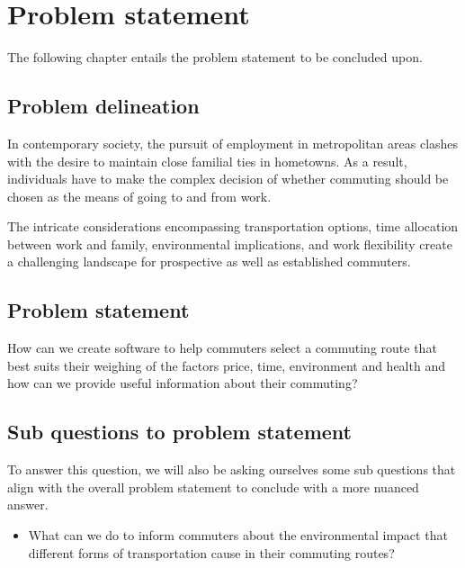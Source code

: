\chapter{Problem statement}\label{ch:problem-statement}

The following chapter entails the problem statement to be concluded upon.

\section{Problem delineation}\label{sec:problem-delineation}

In contemporary society, the pursuit of employment in metropolitan areas clashes with the desire to maintain close
familial ties in hometowns.
As a result, individuals have to make the complex decision of whether commuting should be chosen as the means of
going to and from work.

The intricate considerations encompassing transportation options, time allocation between work and family, environmental
implications, and work flexibility create a challenging landscape for prospective as well as established commuters.

\section{Problem statement}\label{sec:problem-statement}

How can we create software to help commuters select a commuting route that best suits their weighing of the factors
price, time, environment and health and how can we provide useful information about their commuting?

\section{Sub questions to problem statement}\label{sec:sub-questions-to-problem-statement}

To answer this question, we will also be asking ourselves some sub questions that align with the overall problem
statement to conclude with a more nuanced answer.

\begin{itemize}
    \item What can we do to inform commuters about the environmental impact that different forms of transportation
    cause in their commuting routes?
\end{itemize}
